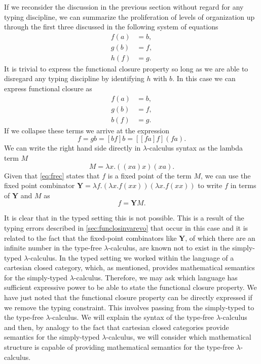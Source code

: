 \documentclass[10pt]{article}
\theoremstyle{plain}
\theoremstyle{definition}
\theoremstyle{remark}
\begin{document}
If we reconsider the discussion in the previous section without regard for any typing discipline, we can summarize the proliferation of levels of organization up through the first three discussed in the following system of equations~\cite{Mossio2009}
\begin{align*}
f(a)&=b,\\
g(b)&=f,\\
h(f)&=g.
\end{align*}
It is trivial to express the functional closure property so long as we are able to disregard any typing discipline by identifying $h$ with $b$. In this case we can express functional closure as
\begin{align*}
f(a)&=b,\\
g(b)&=f,\\
b(f)&=g.
\end{align*}
If we collapse these terms we arrive at the expression
\begin{equation}\label{eq:frec}
f = gb = [bf]b = [[fa]f](fa).
\end{equation}
We can write the right hand side directly in $\lambda$-calculus syntax as the lambda term $M$
$$
M = \lambda x.((xa)x)(xa).
$$
Given that \ref{eq:frec} states that $f$ is a fixed point of the term $M$, we can use the fixed point combinator $\mathbf{Y} = \lambda f.(\lambda x. f (x x))(\lambda x. f (x x))$ to write $f$ in terms of $\mathbf{Y}$ and $M$ as
$$
f = \mathbf{Y}M.
$$

It is clear that in the typed setting this is not possible. This is a result of the typing errors described in \ref{sec:funclosinvarevo} that occur in this case and it is related to the fact that the fixed-point combinators like $\mathbf{Y}$, of which there are an infinite number in the type-free $\lambda$-calculus, are known not to exist in the simply-typed $\lambda$-calculus. In the typed setting we worked within the language of a cartesian closed category, which, as mentioned, provides mathematical semantics for the simply-typed $\lambda$-calculus. Therefore, we may ask which language has sufficient expressive power to be able to state the functional closure property. We have just noted that the functional closure property can be directly expressed if we remove the typing constraint. This involves passing from the simply-typed to the type-free $\lambda$-calculus. We will explain the syntax of the type-free $\lambda$-calculus and then, by analogy to the fact that cartesian closed categories provide semantics for the simply-typed $\lambda$-calculus, we will consider which mathematical structure is capable of providing mathematical semantics for the type-free $\lambda$-calculus.
\end{document}
